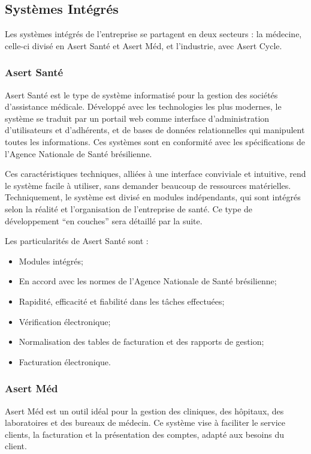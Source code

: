 \subsection{Systèmes Intégrés}

Les systèmes intégrés de l'entreprise se partagent en deux secteurs : la médecine, celle-ci divisé en Asert Santé et Asert Méd, et l'industrie, avec Asert Cycle.

\subsubsection{Asert Santé}

Asert Santé est le type de système informatisé pour la gestion des sociétés d'assistance médicale. Développé avec les technologies les plus modernes, le système se traduit par un portail web comme interface d'administration d'utilisateurs et d'adhérents, et de bases de données relationnelles qui manipulent toutes les informations. Ces systèmes sont en conformité avec les spécifications de l'Agence Nationale de Santé brésilienne.

Ces caractéristiques techniques, alliées à une interface conviviale et intuitive, rend le système facile à utiliser, sans demander beaucoup de ressources matérielles. Techniquement, le système est divisé en modules indépendants, qui sont intégrés selon la réalité et l'organisation de l'entreprise de santé. Ce type de développement ``en couches'' sera détaillé par la suite. 

Les particularités de Asert Santé sont :

\begin{itemize}
\item Modules intégrés;
\item En accord avec les normes de l'Agence Nationale de Santé brésilienne;
\item Rapidité, efficacité et fiabilité dans les tâches effectuées;
\item Vérification électronique;
\item Normalisation des tables de facturation et des rapports de gestion;
\item Facturation électronique.
\end{itemize}

\subsubsection{Asert Méd}

Asert Méd est un outil idéal pour la gestion des cliniques, des hôpitaux, des laboratoires et des bureaux de médecin. Ce système vise à faciliter le service clients, la facturation et la présentation des comptes, adapté aux besoins du client.

